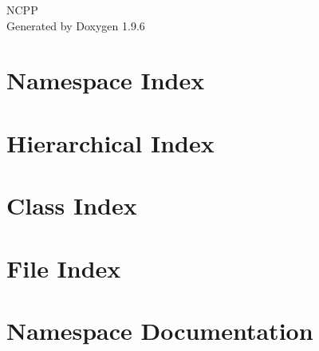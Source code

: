\documentclass[twoside]{book}
\newcommand{\+}{\discretionary{\mbox{\scriptsize$\hookleftarrow$}}{}{}}
\newcommand{\clearemptydoublepage}{%
    \newpage{\pagestyle{empty}\cleardoublepage}%
  }
\begin{document}
  \raggedbottom
    \hypersetup{pageanchor=false,
                bookmarksnumbered=true,
                pdfencoding=unicode
               }
  \begin{titlepage}
  \vspace*{7cm}
  \begin{center}%
  {\Large NCPP}\\
  \vspace*{1cm}
  {\large Generated by Doxygen 1.9.6}\\
  \end{center}
  \end{titlepage}
  \clearemptydoublepage
  \tableofcontents
  \clearemptydoublepage
  \hypersetup{pageanchor=true}
\chapter{Namespace Index}

\chapter{Hierarchical Index}

\chapter{Class Index}

\chapter{File Index}

\chapter{Namespace Documentation}





\end{document}
